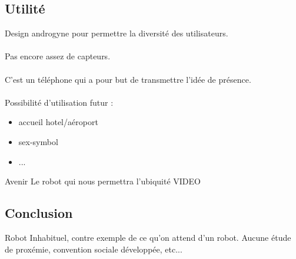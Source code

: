 \documentclass{beamer}
\begin{document}
\subsection{Utilité}
\begin{frame}
  Design androgyne pour permettre la diversité des utilisateurs.\\~\\
  Pas encore assez de capteurs.\\~\\
  C'est un téléphone qui a pour but de transmettre l'idée de présence.\\~\\
  Possibilité d'utilisation futur :
  \begin{itemize}
  \item accueil hotel/aéroport
  \item sex-symbol
  \item ...
  \end{itemize}
\end{frame}

\begin{frame}{Avenir}
  Le robot qui nous permettra l'ubiquité
  \vspace{0.5cm}  
  VIDEO
\end{frame}

\subsection{Conclusion}
\begin{frame}
  Robot Inhabituel, contre exemple de ce qu'on attend d'un robot.
  Aucune étude de proxémie, convention sociale développée, etc...
\end{frame}
\end{document}
